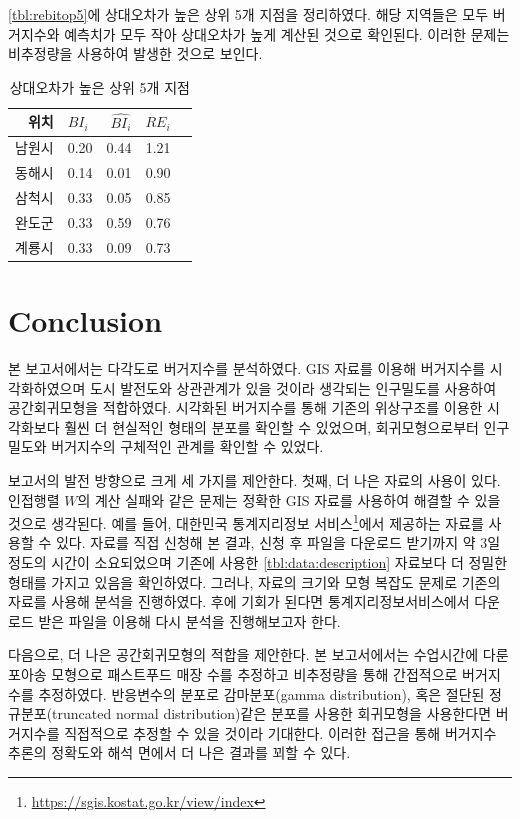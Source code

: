 \documentclass{scrartcl}
\begin{document}
\autoref{tbl:rebitop5}에 상대오차가 높은 상위 5개 지점을 정리하였다. 해당 지역들은 모두 버거지수와 예측치가 모두 작아 상대오차가 높게 계산된 것으로 확인된다. 이러한 문제는 비추정량을 사용하여 발생한 것으로 보인다.
\begin{table}[ht]
    \centering
    \begin{tabular}{rlrrr}
        \hline
        위치 & $BI_i$ & $\hat{BI_i}$ & $RE_i$ \\ 
        \hline
        남원시 & 0.20 & 0.44 & 1.21 \\ 
        동해시 & 0.14 & 0.01 & 0.90 \\ 
        삼척시 & 0.33 & 0.05 & 0.85 \\ 
        완도군 & 0.33 & 0.59 & 0.76 \\ 
        계룡시 & 0.33 & 0.09 & 0.73 \\ 
         \hline
      \end{tabular}
    \caption{상대오차가 높은 상위 5개 지점}\label{tbl:rebitop5}
\end{table}

\clearpage
\section{Conclusion}\label{sec:con}

본 보고서에서는 다각도로 버거지수를 분석하였다. GIS 자료를 이용해 버거지수를 시각화하였으며 도시 발전도와 상관관계가 있을 것이라 생각되는 인구밀도를 사용하여 공간회귀모형을 적합하였다. 시각화된 버거지수를 통해 기존의 위상구조를 이용한 시각화보다 훨씬 더 현실적인 형태의 분포를 확인할 수 있었으며, 회귀모형으로부터 인구밀도와 버거지수의 구체적인 관계를 확인할 수 있었다. 

보고서의 발전 방향으로 크게 세 가지를 제안한다. 첫째, 더 나은 자료의 사용이 있다. 인접행렬 $W$의 계산 실패와 같은 문제는 정확한 GIS 자료를 사용하여 해결할 수 있을 것으로 생각된다. 예를 들어, 대한민국 통계지리정보 서비스\footnote{\url{https://sgis.kostat.go.kr/view/index}}에서 제공하는 자료를 사용할 수 있다. 자료를 직접 신청해 본 결과, 신청 후 파일을 다운로드 받기까지 약 3일 정도의 시간이 소요되었으며 기존에 사용한 \autoref{tbl:data:description} 자료보다 더 정밀한 형태를 가지고 있음을 확인하였다. 그러나, 자료의 크기와 모형 복잡도 문제로 기존의 자료를 사용해 분석을 진행하였다. 후에 기회가 된다면 통계지리정보서비스에서 다운로드 받은 파일을 이용해 다시 분석을 진행해보고자 한다.

다음으로, 더 나은 공간회귀모형의 적합을 제안한다. 본 보고서에서는 수업시간에 다룬 포아송 모형으로 패스트푸드 매장 수를 추정하고 비추정량을 통해 간접적으로 버거지수를 추정하였다. 반응변수의 분포로 감마분포(gamma distribution), 혹은 절단된 정규분포(truncated normal distribution)\와 같은 분포를 사용한 회귀모형을 사용한다면 버거지수를 직접적으로 추정할 수 있을 것이라 기대한다. 이러한 접근을 통해 버거지수 추론의 정확도와 해석 면에서 더 나은 결과를 꾀할 수 있다.
\end{document}
